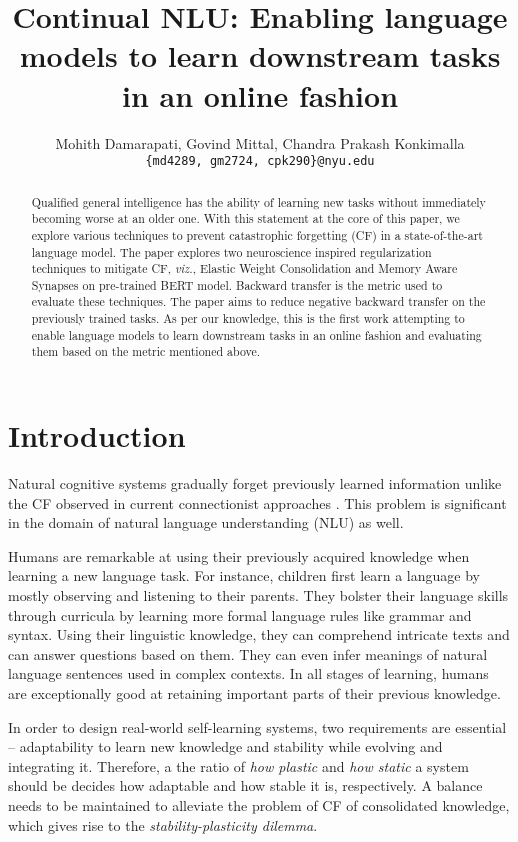 \documentclass[11pt,a4paper]{article}
\title{Continual NLU: Enabling language models to learn downstream tasks in an online fashion}
\author{{Mohith Damarapati, Govind Mittal, Chandra Prakash Konkimalla}\\
  {\tt \{md4289, gm2724, cpk290\}@nyu.edu}}
\date{}
\begin{document}
\maketitle
\begin{abstract}
  Qualified general intelligence has the ability of learning new tasks without immediately becoming worse at an older one. With this statement at the core of this paper, we explore various techniques to prevent catastrophic forgetting  (CF) in a state-of-the-art language model. The paper explores two neuroscience inspired regularization techniques to mitigate CF, \textit{viz.}, Elastic Weight Consolidation and Memory Aware Synapses on pre-trained BERT model. Backward transfer is the
  metric used to evaluate these techniques. The paper aims to reduce negative backward transfer on the previously trained tasks. As per our knowledge, this is the first work attempting to enable language models to learn downstream tasks in an online fashion and evaluating them based on the metric mentioned above.
\end{abstract}


\section{Introduction}
\label{sec:intro}

Natural cognitive systems gradually forget previously learned information unlike the CF observed in current connectionist approaches \cite{french1999catastrophic}.  This problem is significant in the domain of natural language understanding  (NLU) as well.  

Humans are remarkable at using their previously acquired knowledge when learning a new language task.  For instance, children first learn a language by mostly observing and listening to their parents.  They bolster their language skills through curricula by learning more formal language rules like grammar and syntax.  Using their linguistic knowledge, they can comprehend intricate texts and can answer questions based on them.  They can even infer meanings of natural language sentences used in complex contexts.  In all stages of learning, humans are exceptionally good at retaining important parts of their previous knowledge.  

In order to design real-world self-learning systems, two requirements are essential -- adaptability to learn new knowledge and stability while evolving and integrating it. Therefore, a the ratio of \textit{how plastic} and \textit{how static} a system should be decides how adaptable and how stable it is, respectively. A balance needs to be maintained to alleviate the problem of CF of consolidated knowledge, which gives rise to the \textit{stability-plasticity dilemma}.
\end{document}
